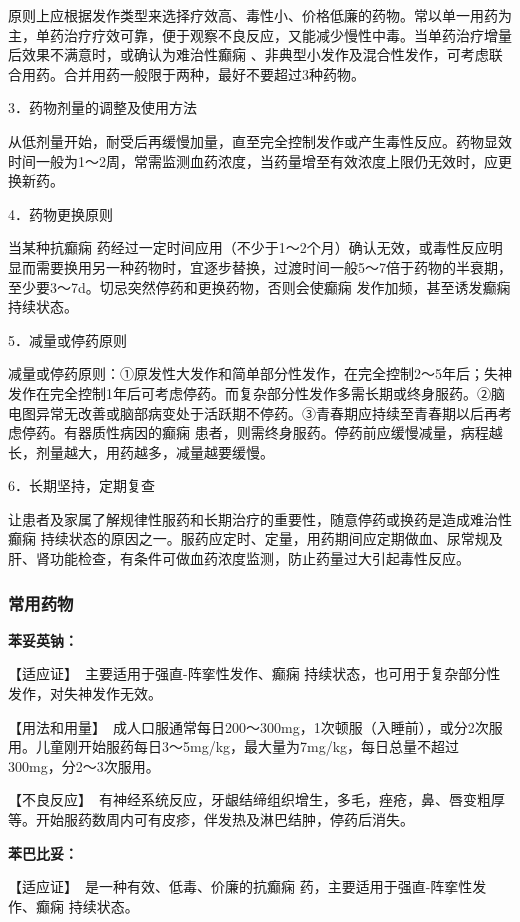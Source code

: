 原则上应根据发作类型来选择疗效高、毒性小、价格低廉的药物。常以单一用药为主，单药治疗疗效可靠，便于观察不良反应，又能减少慢性中毒。当单药治疗增量后效果不满意时，或确认为难治性癫痫
、非典型小发作及混合性发作，可考虑联合用药。合并用药一般限于两种，最好不要超过3种药物。

3．药物剂量的调整及使用方法

从低剂量开始，耐受后再缓慢加量，直至完全控制发作或产生毒性反应。药物显效时间一般为1～2周，常需监测血药浓度，当药量增至有效浓度上限仍无效时，应更换新药。

4．药物更换原则

当某种抗癫痫
药经过一定时间应用（不少于1～2个月）确认无效，或毒性反应明显而需要换用另一种药物时，宜逐步替换，过渡时间一般5～7倍于药物的半衰期，至少要3～7d。切忌突然停药和更换药物，否则会使癫痫
发作加频，甚至诱发癫痫 持续状态。

5．减量或停药原则

减量或停药原则：①原发性大发作和简单部分性发作，在完全控制2～5年后；失神发作在完全控制1年后可考虑停药。而复杂部分性发作多需长期或终身服药。②脑电图异常无改善或脑部病变处于活跃期不停药。③青春期应持续至青春期以后再考虑停药。有器质性病因的癫痫
患者，则需终身服药。停药前应缓慢减量，病程越长，剂量越大，用药越多，减量越要缓慢。

6．长期坚持，定期复查

让患者及家属了解规律性服药和长期治疗的重要性，随意停药或换药是造成难治性癫痫
持续状态的原因之一。服药应定时、定量，用药期间应定期做血、尿常规及肝、肾功能检查，有条件可做血药浓度监测，防止药量过大引起毒性反应。

\subsubsection{常用药物}

\textbf{苯妥英钠：}

【适应证】　主要适用于强直-阵挛性发作、癫痫
持续状态，也可用于复杂部分性发作，对失神发作无效。

【用法和用量】　成人口服通常每日200～300mg，1次顿服（入睡前），或分2次服用。儿童刚开始服药每日3～5mg/kg，最大量为7mg/kg，每日总量不超过300mg，分2～3次服用。

【不良反应】　有神经系统反应，牙龈结缔组织增生，多毛，痤疮，鼻、唇变粗厚等。开始服药数周内可有皮疹，伴发热及淋巴结肿，停药后消失。

\textbf{苯巴比妥：}

【适应证】　是一种有效、低毒、价廉的抗癫痫
药，主要适用于强直-阵挛性发作、癫痫
持续状态。


